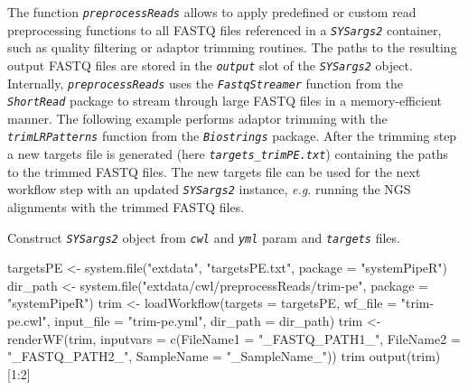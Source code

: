 \documentclass[14pt,]{article}
\newcommand{\hlnum}[1]{\textcolor[rgb]{0.816,0.125,0.439}{#1}}%
\newcommand{\hlstr}[1]{\textcolor[rgb]{0.251,0.627,0.251}{#1}}%
\newcommand{\hlstd}[1]{\textcolor[rgb]{0.251,0.251,0.251}{#1}}%
\newenvironment{Shaded}{\begin{myshaded}}{\end{myshaded}}
\newcommand{\DecValTok}[1]{\hlnum{#1}}
\newcommand{\SpecialCharTok}[1]{\hlstr{#1}}
\newcommand{\StringTok}[1]{\hlstr{#1}}
\newcommand{\OtherTok}[1]{{#1}}
\newcommand{\FunctionTok}[1]{\hlstd{#1}}
\newcommand{\AttributeTok}[1]{{#1}}
\newcommand{\NormalTok}[1]{\hlstd{#1}}
\begin{document}
The function \emph{\texttt{preprocessReads}} allows to apply predefined or custom
read preprocessing functions to all FASTQ files referenced in a
\emph{\texttt{SYSargs2}} container, such as quality filtering or adaptor trimming
routines. The paths to the resulting output FASTQ files are stored in the
\emph{\texttt{output}} slot of the \emph{\texttt{SYSargs2}} object. Internally,
\emph{\texttt{preprocessReads}} uses the \emph{\texttt{FastqStreamer}} function from
the \emph{\texttt{ShortRead}} package to stream through large FASTQ files in a
memory-efficient manner. The following example performs adaptor trimming with
the \emph{\texttt{trimLRPatterns}} function from the \emph{\texttt{Biostrings}} package.
After the trimming step a new targets file is generated (here
\emph{\texttt{targets\_trimPE.txt}}) containing the paths to the trimmed FASTQ files.
The new targets file can be used for the next workflow step with an updated
\emph{\texttt{SYSargs2}} instance, \emph{e.g.} running the NGS alignments with the
trimmed FASTQ files.

Construct \emph{\texttt{SYSargs2}} object from \emph{\texttt{cwl}} and \emph{\texttt{yml}} param and \emph{\texttt{targets}} files.

\begin{Shaded}
\begin{Highlighting}[]
\NormalTok{targetsPE }\OtherTok{\textless{}{-}} \FunctionTok{system.file}\NormalTok{(}\StringTok{"extdata"}\NormalTok{, }\StringTok{"targetsPE.txt"}\NormalTok{, }\AttributeTok{package =} \StringTok{"systemPipeR"}\NormalTok{)}
\NormalTok{dir\_path }\OtherTok{\textless{}{-}} \FunctionTok{system.file}\NormalTok{(}\StringTok{"extdata/cwl/preprocessReads/trim{-}pe"}\NormalTok{, }\AttributeTok{package =} \StringTok{"systemPipeR"}\NormalTok{)}
\NormalTok{trim }\OtherTok{\textless{}{-}} \FunctionTok{loadWorkflow}\NormalTok{(}\AttributeTok{targets =}\NormalTok{ targetsPE, }\AttributeTok{wf\_file =} \StringTok{"trim{-}pe.cwl"}\NormalTok{, }\AttributeTok{input\_file =} \StringTok{"trim{-}pe.yml"}\NormalTok{, }
    \AttributeTok{dir\_path =}\NormalTok{ dir\_path)}
\NormalTok{trim }\OtherTok{\textless{}{-}} \FunctionTok{renderWF}\NormalTok{(trim, }\AttributeTok{inputvars =} \FunctionTok{c}\NormalTok{(}\AttributeTok{FileName1 =} \StringTok{"\_FASTQ\_PATH1\_"}\NormalTok{, }\AttributeTok{FileName2 =} \StringTok{"\_FASTQ\_PATH2\_"}\NormalTok{, }
    \AttributeTok{SampleName =} \StringTok{"\_SampleName\_"}\NormalTok{))}
\NormalTok{trim}
\FunctionTok{output}\NormalTok{(trim)[}\DecValTok{1}\SpecialCharTok{:}\DecValTok{2}\NormalTok{]}
\end{Highlighting}
\end{Shaded}
\end{document}
